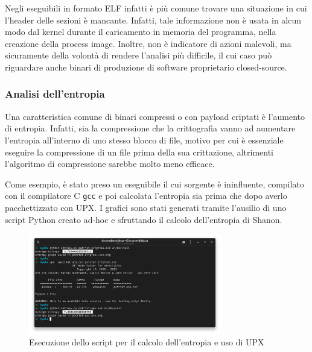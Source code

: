 Negli eseguibili in formato ELF infatti è più comune trovare una situazione in cui l'header delle sezioni è mancante. Infatti, tale informazione non è usata in alcun modo dal kernel durante il caricamento in memoria del programma, nella creazione della process image. Inoltre, non è indicatore di azioni malevoli, ma sicuramente della volontà di rendere l'analisi più difficile, il cui caso può riguardare anche binari di produzione di software proprietario closed-source.

\subsubsection{Analisi dell'entropia}
Una caratteristica comune di binari compressi o con payload criptati è l'aumento di entropia. Infatti, sia la compressione che la crittografia vanno ad aumentare l'entropia all'interno di uno stesso blocco di file, motivo per cui è essenziale eseguire la compressione di un file prima della sua crittazione, altrimenti l'algoritmo di compressione sarebbe molto meno efficace.

Come esempio, è stato preso un eseguibile il cui sorgente è ininfluente, compilato con il compilatore C \texttt{gcc} e poi calcolata l'entropia sia prima che dopo averlo pacchettizzato con UPX. I grafici sono stati generati tramite l'ausilio di uno script Python creato ad-hoc e sfruttando il calcolo dell'entropia di Shanon.

\begin{figure}[htbp]
    \centering
    \includegraphics[width=0.75\textwidth]{assets/entropy_script_terminal.png}
    \caption{Esecuzione dello script per il calcolo dell'entropia e uso di UPX}
    \label{fig:entropy_script_terminal}
\end{figure}


